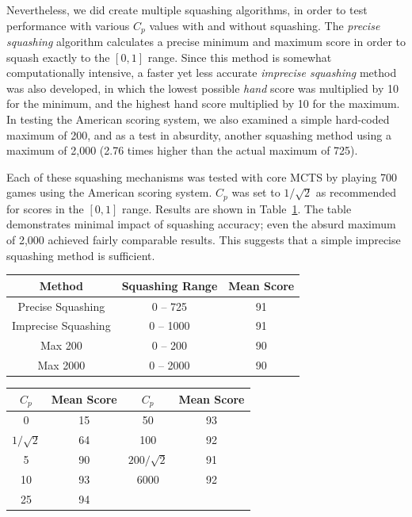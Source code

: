 \documentclass[letterpaper]{article}
\begin{document}
Nevertheless, we did create multiple squashing algorithms, in order to test performance with various $C_p$ values with and without squashing. The {\it precise squashing} algorithm calculates a precise minimum and maximum score in order to squash exactly to the $[0,1]$ range. Since this method is somewhat computationally intensive, a faster yet less accurate {\it imprecise squashing} method was also developed, in which the lowest possible {\it hand} score was multiplied by 10 for the minimum, and the highest hand score multiplied by 10 for the maximum. In testing the American scoring system, we also examined a simple hard-coded maximum of 200, and as a test in absurdity, another squashing method using a maximum of 2,000 (2.76 times higher than the actual maximum of 725).

Each of these squashing mechanisms was tested with core MCTS by playing 700 games using the American scoring system. $C_p$ was set to $1 / \sqrt{2}$ as recommended for scores in the $[0,1]$ range. Results are shown in Table~\ref{tbl:Squashing}. The table demonstrates minimal impact of squashing accuracy; even the absurd maximum of 2,000 achieved fairly comparable results. This suggests that a simple imprecise squashing method is sufficient.

\begin{table}
\label{tbl:Squashing}
\centering
\begin{tabular}{c c c}
\hline
Method & Squashing Range & Mean Score \\
\hline
Precise Squashing & 0 -- 725 & 91 \\
Imprecise Squashing & 0 -- 1000 & 91 \\
Max 200 & 0 -- 200 & 90 \\
Max 2000 & 0 -- 2000 & 90 \\
\hline
\end{tabular}
\end{table}

\begin{table}
\label{tbl:noSquashing}
\centering
\begin{tabular}{c c || c c}
\hline
{\bf $C_p$} & {\bf Mean Score} & {\bf $C_p$} & {\bf Mean Score} \\
\hline
0 & 15 &                                        50 & 93        \\
$1 / \sqrt{2}$ & 64 &                      100 & 92                       \\
5 & 90 &                                        $200 / \sqrt{2}$ & 91       \\
10 & 93 &                                      6000 & 92        \\
25 & 94 \\
\hline
\end{tabular}
\end{table}
\end{document}
